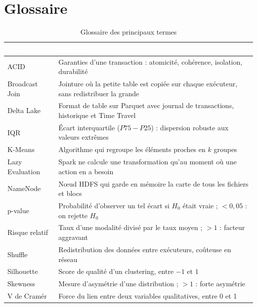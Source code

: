 \documentclass[11pt,a4paper]{report}
\newcommand{\hd}[1]{\textcolor{white}{\bfseries #1}}
\newcommand{\headrow}{\rowcolor{primary}}
\begin{document}
\section{Glossaire}

\begin{table}[H]
\centering
\small
{}
\begin{tabularx}{\textwidth}{@{}l X@{}}
\toprule
\headrow \hd{Terme} & \hd{Définition} \\
\midrule
ACID & Garanties d'une transaction : atomicité, cohérence, isolation, durabilité \\
Broadcast Join & Jointure où la petite table est copiée sur chaque exécuteur, sans redistribuer la grande \\
Delta Lake & Format de table sur Parquet avec journal de transactions, historique et Time Travel \\
IQR & Écart interquartile ($P75 - P25$) : dispersion robuste aux valeurs extrêmes \\
K-Means & Algorithme qui regroupe les éléments proches en $k$ groupes \\
Lazy Evaluation & Spark ne calcule une transformation qu'au moment où une action en a besoin \\
NameNode & Nœud HDFS qui garde en mémoire la carte de tous les fichiers et blocs \\
p-value & Probabilité d'observer un tel écart si $H_0$ était vraie ; $< 0{,}05$ : on rejette $H_0$ \\
Risque relatif & Taux d'une modalité divisé par le taux moyen ; $> 1$ : facteur aggravant \\
Shuffle & Redistribution des données entre exécuteurs, coûteuse en réseau \\
Silhouette & Score de qualité d'un clustering, entre $-1$ et $1$ \\
Skewness & Mesure d'asymétrie d'une distribution ; $> 1$ : forte asymétrie \\
V de Cramér & Force du lien entre deux variables qualitatives, entre 0 et 1 \\
\bottomrule
\end{tabularx}
\caption{Glossaire des principaux termes}
\end{table}
\end{document}
